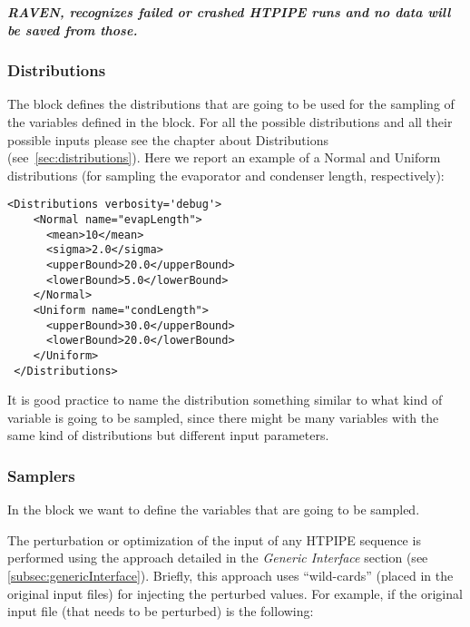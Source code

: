 \textbf{\textit{\nb RAVEN, recognizes failed or crashed HTPIPE runs and no data will be saved from those.}}

\subsubsection{Distributions}
The  block defines the distributions that are going
to be used for the sampling of the variables defined in the  block.
%
For all the possible distributions and all their possible inputs please see the
chapter about Distributions (see~\ref{sec:distributions}).
%
Here we report an example of a Normal and Uniform distributions (for sampling the evaporator and condenser length, respectively):

\begin{lstlisting}[style=XML,morekeywords={name,debug}]
<Distributions verbosity='debug'>
    <Normal name="evapLength">
      <mean>10</mean>
      <sigma>2.0</sigma>
      <upperBound>20.0</upperBound>
      <lowerBound>5.0</lowerBound>
    </Normal>
    <Uniform name="condLength">
      <upperBound>30.0</upperBound>
      <lowerBound>20.0</lowerBound>
    </Uniform>
 </Distributions>
\end{lstlisting}

\noindent
It is good practice to name the distribution something similar to what kind of
variable is going to be sampled, since there might be many variables with the
same kind of distributions but different input parameters.

\subsubsection{Samplers}
In the  block we want to define the variables that are going to be sampled.

\noindent The perturbation or optimization of the input of any HTPIPE sequence is performed using the approach detailed in the \textit{Generic Interface} section (see \ref{subsec:genericInterface}). 
Briefly, this approach uses
 ``wild-cards'' (placed in the original input files) for injecting the perturbed values.
 For example, if the original input file (that needs to be perturbed) is the following:

